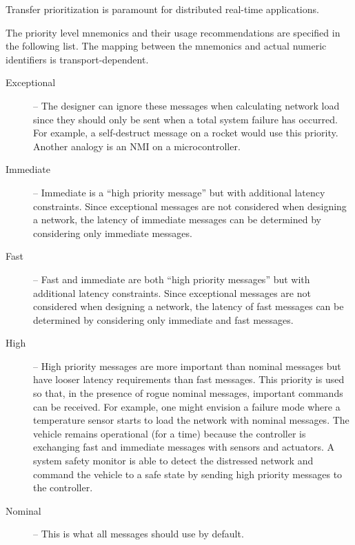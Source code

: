 \begin{remark}[breakable]
    Transfer prioritization is paramount for distributed real-time applications.

    The priority level mnemonics and their usage recommendations are specified in the following list.
    The mapping between the mnemonics and actual numeric identifiers is transport-dependent.

    \begin{description}
        \item[Exceptional] -- The designer can ignore these messages when calculating network load since they
        should only be sent when a total system failure has occurred.
        For example, a self-destruct message on a rocket would use this priority.
        Another analogy is an NMI on a microcontroller.

        \item[Immediate] -- Immediate is a ``high priority message'' but with additional latency constraints.
        Since exceptional messages are not considered when designing a network, the latency of immediate messages
        can be determined by considering only immediate messages.

        \item[Fast] -- Fast and immediate are both ``high priority messages'' but with additional latency constraints.
        Since exceptional messages are not considered when designing a network,
        the latency of fast messages can be determined by considering only immediate and fast messages.

        \item[High] -- High priority messages are more important than nominal messages but have looser
        latency requirements than fast messages. This priority is used so that,
        in the presence of rogue nominal messages, important commands can be received.
        For example, one might envision a failure mode where a temperature sensor starts to
        load the network with nominal messages.
        The vehicle remains operational (for a time) because the controller is exchanging fast and
        immediate messages with sensors and actuators.
        A system safety monitor is able to detect the distressed network and command the vehicle to a
        safe state by sending high priority messages to the controller.

        \item[Nominal] -- This is what all messages should use by default.


\end{description}
\end{remark}
